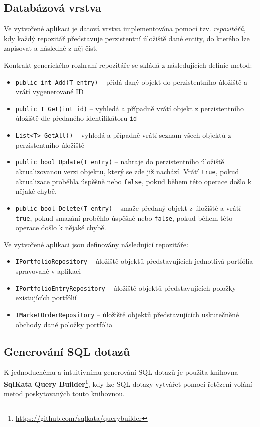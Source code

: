 \documentclass[12pt, a4paper]{article}
\begin{document}
\subsection{Databázová vrstva}
Ve vytvořené aplikaci je datová vrstva implementována pomocí tzv. \textit{repozitářů}, kdy každý repozitář představuje perzistentní úložiště dané entity, do kterého lze zapisovat a následně z něj číst.

Kontrakt generického rozhraní repozitáře se skládá z následujících definic metod:
\begin{itemize}
    \item \texttt{public int Add(T entry)} -- přidá daný objekt do perzistentního úložiště a vrátí vygenerované ID
    \item \texttt{public T Get(int id)} -- vyhledá a případně vrátí objekt z perzistentního úložiště dle předaného identifikátoru \texttt{id}
    \item \texttt{List<T> GetAll()} -- vyhledá a případně vrátí seznam všech objektů z perzistentního úložiště
    \item \texttt{public bool Update(T entry)} -- nahraje do perzistentního úložiště aktualizovanou verzi objektu, který se zde již nachází. Vrátí \texttt{true}, pokud aktualizace proběhla úspěšně nebo \texttt{false}, pokud během této operace došlo k nějaké chybě.
    \item \texttt{public bool Delete(T entry)} -- smaže předaný objekt z úložiště a vrátí \texttt{true}, pokud smazání proběhlo úspěšně nebo \texttt{false}, pokud během této operace došlo k nějaké chybě.

\end{itemize}

Ve vytvořené aplikaci jsou definovány následující repozitáře:
\begin{itemize} 
    \item \texttt{IPortfolioRepository} -- úložiště objektů představujících jednotlivá portfólia spravované v aplikaci
    \item \texttt{IPortfolioEntryRepository} -- úložiště objektů představujících položky existujících portfólií 
    \item \texttt{IMarketOrderRepository} -- úložiště objektů představujících uskutečněné obchody dané položky portfólia
\end{itemize}

\subsection{Generování SQL dotazů}
K jednoduchému a intuitivnímu generování SQL dotazů je použita knihovna \textbf{SqlKata Query Builder}\footnote{\url{https://github.com/sqlkata/querybuilder}}, kdy lze SQL dotazy vytvářet pomocí řetězení volání metod poskytovaných touto knihovnou.
\end{document}
